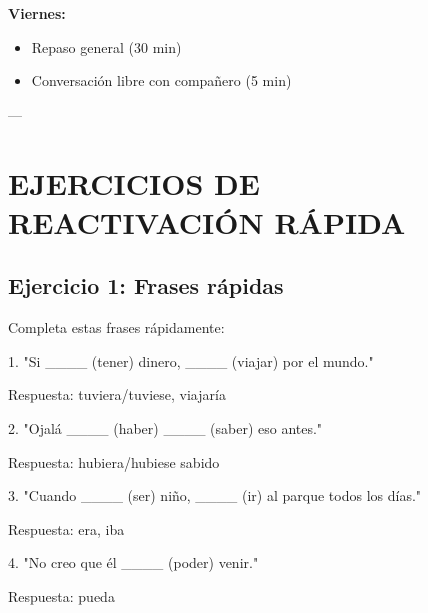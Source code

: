 \documentclass[a4paper,11pt]{article}
\begin{document}
\vspace{0.2cm}

\textbf{Viernes:}

\begin{itemize}

  \item Repaso general (30 min)

  \item Conversación libre con compañero (5 min)

\end{itemize}

\vspace{0.2cm}

---

\vspace{0.2cm}

\section{EJERCICIOS DE REACTIVACIÓN RÁPIDA}

\vspace{0.2cm}

\subsection{Ejercicio 1: Frases rápidas}

Completa estas frases rápidamente:

\vspace{0.2cm}

1. "Si ____ (tener) dinero, ____ (viajar) por el mundo."

Respuesta: tuviera/tuviese, viajaría

\vspace{0.2cm}

2. "Ojalá ____ (haber) ____ (saber) eso antes."

Respuesta: hubiera/hubiese sabido

\vspace{0.2cm}

3. "Cuando ____ (ser) niño, ____ (ir) al parque todos los días."

Respuesta: era, iba

\vspace{0.2cm}

4. "No creo que él ____ (poder) venir."

Respuesta: pueda

\vspace{0.2cm}
\end{document}
